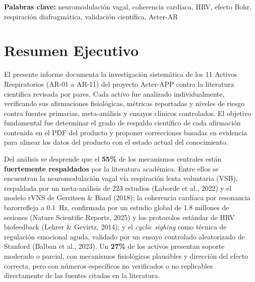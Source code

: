 \documentclass[12pt,a4paper]{article}
\newcommand{\destacado}[1]{\textbf{#1}}
\begin{document}
\vspace{0.3cm}

\begin{center}
{\small \textbf{Palabras clave:} neuromodulación vagal, coherencia cardíaca, HRV,
efecto Bohr, respiración diafragmática, validación científica, Aeter-AR}
\end{center}

\newpage

\tableofcontents
\newpage

\section{Resumen Ejecutivo}

El presente informe documenta la investigación sistemática de los 11 Activos
Respiratorios (AR-01 a AR-11) del proyecto Aeter-APP contra la literatura
científica revisada por pares. Cada activo fue analizado individualmente,
verificando sus afirmaciones fisiológicas, métricas reportadas y niveles de
riesgo contra fuentes primarias, meta-análisis y ensayos clínicos controlados.
El objetivo fundamental fue determinar el grado de respaldo científico de cada
afirmación contenida en el PDF del producto y proponer correcciones basadas en
evidencia para alinear los datos del producto con el estado actual del
conocimiento.

\vspace{0.2cm}

Del análisis se desprende que el \destacado{55\%} de los mecanismos centrales
están \textcolor{verde}{\textbf{fuertemente respaldados}} por la literatura
académica. Entre ellos se encuentran la neuromodulación vagal vía respiración
lenta voluntaria (VSB), respaldada por un meta-análisis de 223 estudios
(Laborde et al., 2022) y el modelo rVNS de Gerritsen \& Band (2018); la
coherencia cardíaca por resonancia barorrefleja a 0.1~Hz, confirmada por un
estudio global de 1.8 millones de sesiones (Nature Scientific Reports, 2025)
y los protocolos estándar de HRV biofeedback (Lehrer \& Gevirtz, 2014); y el
\textit{cyclic sighing} como técnica de regulación emocional aguda, validado
por un ensayo controlado aleatorizado de Stanford (Balban et al., 2023). Un
\destacado{27\%} de los activos presentan soporte moderado o parcial, con
mecanismos fisiológicos plausibles y dirección del efecto correcta, pero con
números específicos no verificados o no replicables directamente de las fuentes
citadas en la literatura.
\end{document}
